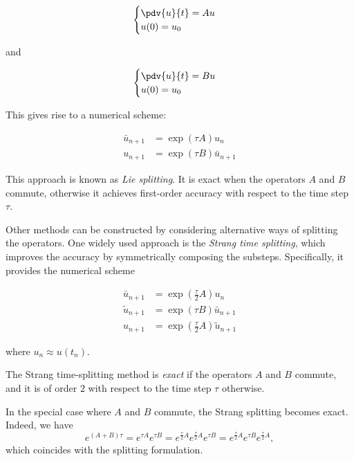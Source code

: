 \[
    \begin{cases}
        \pdv{u}{t} = A u \\
        u(0) = u_0
    \end{cases}
    \label{eq:subproblemA}
\]

and

\[
    \begin{cases}
        \pdv{u}{t} = B u \\
        u(0) = u_0
    \end{cases} 
\]

This gives rise to a numerical scheme:

\[
    \begin{aligned}
        \bar{u}_{n+1} &= \exp(\tau A)u_n \\
        u_{n+1} &= \exp(\tau B)\bar{u}_{n+1}
    \end{aligned}
\]

This approach is known as \emph{Lie splitting}. It is exact when the operators $A$ and $B$ commute, otherwise it achieves first-order accuracy with respect to the time step $\tau$.

Other methods can be constructed by considering alternative ways of splitting the operators. One widely used approach is the \emph{Strang time splitting}, which improves the accuracy by symmetrically composing the substeps. Specifically, it provides the numerical scheme

\begin{equation}
    \begin{aligned}
        \bar{u}_{n+1} &= \exp\left(\frac\tau2 A\right)u_n \\
        \tilde{u}_{n+1} &= \exp(\tau B)\bar{u}_{n+1} \\
        u_{n+1} &= \exp\left(\frac\tau2 A\right)\tilde{u}_{n+1}
    \end{aligned}
\end{equation}

where $u_n \approx u(t_n)$.

\begin{proposition}
    The Strang time-splitting method is \emph{exact} if the operators $A$ and $B$ commute, and it is of order $2$ with respect to the time step $\tau$ otherwise.
\end{proposition}

\begin{remark}
    In the special case where $A$ and $B$ commute, the Strang splitting becomes exact. Indeed, we have
    \[
        e^{(A+B)\tau} = e^{\tau A} e^{\tau B} 
        = e^{\frac{\tau}{2} A} e^{\frac{\tau}{2} A} e^{\tau B} 
        = e^{\frac{\tau}{2} A} e^{\tau B} e^{\frac{\tau}{2} A},
    \]
    which coincides with the splitting formulation.
\end{remark}


